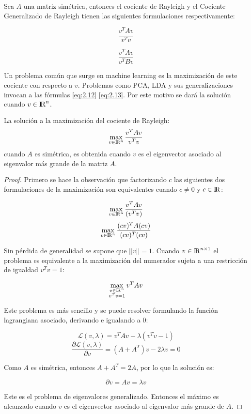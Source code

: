 Sea $A$ una matriz simétrica, entonces el cociente de Rayleigh y el Cociente Generalizado de Rayleigh tienen las siguientes formulaciones respectivamente:


\begin{equation}\label{eq:2.12}
\frac{v^T A v}{v^T v}
\end{equation}

\begin{equation}\label{eq:2.13}
\frac{v^T A v}{v^T B v}
\end{equation}

Un problema común que surge en machine learning es la maximización de este cociente con respecto a $v$. Problemas como PCA, LDA y sus generalizaciones invocan a las fórmulas \ref{eq:2.12} \ref{eq:2.13}. Por este motivo se dará la solución cuando $v \in {\rm I\!R}^{n}$.

\begin{proposition} \label{lemma2.2}
La solución a la maximización del cociente de Rayleigh:
$$\max_{v \in {\rm I\!R}^{n} } \frac{v^T A v}{v^Tv} $$
cuando $A$ es simétrica, es obtenida cuando $v$ es el eigenvector asociado al eigenvalor más grande de la matriz $A$.
\end{proposition}


\begin{proof}
Primero se hace la observación que factorizando $c$ las siguientes dos formulaciones de la maximización son equivalentes cuando $c \neq 0$ y $c \in {\rm I\!R}$: 

$$\max_{v \in {\rm I\!R}^{n} } \frac{v^T A v}{(v^T v)} $$
$$\max_{v \in {\rm I\!R}^{n} } \frac{(cv)^T A (cv)}{(cv)^T(cv)} $$

Sin pérdida de generalidad se supone que $||v|| = 1$. Cuando $v \in {\rm I\!R}^{n \times 1}$ el problema es equivalente a la maximización del numerador sujeta a una restricción de igualdad $v^T v = 1$:

$$\max_{\substack{v \in {\rm I\!R}^{n}\\ v^T v = 1 }} v^T A v $$

Este problema es más sencillo y se puede resolver formulando la función lagrangiana asociado, derivando e igualando a $0$:

$$\mathcal{L}(v, \lambda) = v^T A v - \lambda(v^T v -1)$$
$$\frac{\partial \mathcal{L}(v, \lambda)}{\partial v} = (A + A^T) v - 2\lambda v = 0$$

Como $A$ es simétrica, entonces $A + A^T = 2A$, por lo que la solución es:

\begin{equation}\label{eq:2.14}
{\partial v} = A v = \lambda v	
\end{equation}


Este es el problema de eigenvalores generalizado. Entonces el máximo es alcanzado cuando $v$ es el eigenvector asociado al eigenvalor más grande de $A$.

\end{proof}

